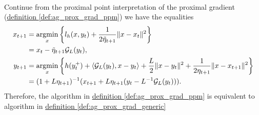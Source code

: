 \documentclass[12pt]{article}
\begin{document}
    \begin{proposition}
        \label{prop:derive_ag_prox_grad_tript}
        \quad \\
        Continue from the proximal point interpretation of the proximal gradient 
        (\hyperref[def:ag_prox_grad_ppm]{definition \ref*{def:ag_prox_grad_ppm}})
        we have the equalities 
        \begin{align*}
            x_{t + 1} &= \mathop{\rm argmin}\limits_{x}
            \left\lbrace
                l_h(x, y_t) + \frac{1}{2\tilde \eta_{t + 1}} \Vert x - x_t\Vert^2
            \right\rbrace
            \\
            &= x_t - \tilde\eta_{t + 1} \mathcal G_L(y_t), 
            \\
            y_{t + 1} &= \mathop{\rm argmin}\limits_{x}
            \left\lbrace
                    h(y_t^+) + \langle \mathcal G_L(y_t), x - y_t\rangle + \frac{L}{2}\Vert x -y_t\Vert^2 + \frac{1}{2\eta_{t + 1}}\Vert x - x_{t + 1}\Vert^2
            \right\rbrace
            \\
            &= (1 + L\eta_{t + 1})^{-1}
            (x_{t + 1} + L\eta_{t + 1}(y_t - L^{-1}\mathcal  G_L(y_t))). 
        \end{align*}
        Therefore, the algorithm in
        \hyperref[def:ag_prox_grad_ppm]{definition \ref*{def:ag_prox_grad_ppm}}
        is equivalent to algorithm in
        \hyperref[def:ag_prox_grad_generic]{definition \ref*{def:ag_prox_grad_generic}}
    \end{proposition}
\end{document}
